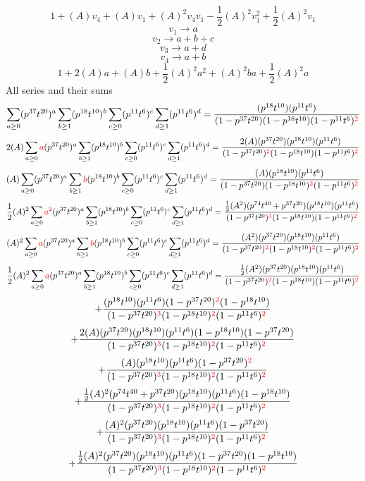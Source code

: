\documentclass{article}
\begin{document}
                \[1+(A)v_4+(A)v_1+(A)^2v_4v_1-\frac{1}{2}(A)^2v_1^{2}+\frac{1}{2}(A)^2v_1\]\[v_1\rightarrow{a}\]\[v_2\rightarrow{a+b+c}\]\[v_3\rightarrow{a+d}\]\[v_4\rightarrow{a+b}\]\[1+2(A)a+(A)b+\frac{1}{2}(A)^2a^{2}+(A)^2ba+\frac{1}{2}(A)^2a\]All series and their sums\[\sum_{a\geq{0}}(p^{37}t^{20})^{a}\sum_{b\geq{1}}(p^{18}t^{10})^{b}\sum_{c\geq{0}}(p^{11}t^{6})^{c}\sum_{d\geq{1}}(p^{11}t^{6})^{d}=\frac{(p^{18}t^{10})(p^{11}t^{6})}{(1-p^{37}t^{20})(1-p^{18}t^{10})(1-p^{11}t^{6})^{\textcolor{red}{2}}}\]\[2(A)\sum_{a\geq{0}}\textcolor{red}{a}(p^{37}t^{20})^{a}\sum_{b\geq{1}}(p^{18}t^{10})^{b}\sum_{c\geq{0}}(p^{11}t^{6})^{c}\sum_{d\geq{1}}(p^{11}t^{6})^{d}=\frac{2(A)(p^{37}t^{20})(p^{18}t^{10})(p^{11}t^{6})}{(1-p^{37}t^{20})^{\textcolor{red}{2}}(1-p^{18}t^{10})(1-p^{11}t^{6})^{\textcolor{red}{2}}}\]\[(A)\sum_{a\geq{0}}(p^{37}t^{20})^{a}\sum_{b\geq{1}}\textcolor{red}{b}(p^{18}t^{10})^{b}\sum_{c\geq{0}}(p^{11}t^{6})^{c}\sum_{d\geq{1}}(p^{11}t^{6})^{d}=\frac{(A)(p^{18}t^{10})(p^{11}t^{6})}{(1-p^{37}t^{20})(1-p^{18}t^{10})^{\textcolor{red}{2}}(1-p^{11}t^{6})^{\textcolor{red}{2}}}\]\[\frac{1}{2}(A)^{2}\sum_{a\geq{0}}\textcolor{red}{a^{2}}(p^{37}t^{20})^{a}\sum_{b\geq{1}}(p^{18}t^{10})^{b}\sum_{c\geq{0}}(p^{11}t^{6})^{c}\sum_{d\geq{1}}(p^{11}t^{6})^{d}=\frac{\frac{1}{2}(A^{2})(p^{74}t^{40}+p^{37}t^{20})(p^{18}t^{10})(p^{11}t^{6})}{(1-p^{37}t^{20})^{\textcolor{red}{3}}(1-p^{18}t^{10})(1-p^{11}t^{6})^{\textcolor{red}{2}}}\]\[(A)^{2}\sum_{a\geq{0}}\textcolor{red}{a}(p^{37}t^{20})^{a}\sum_{b\geq{1}}\textcolor{red}{b}(p^{18}t^{10})^{b}\sum_{c\geq{0}}(p^{11}t^{6})^{c}\sum_{d\geq{1}}(p^{11}t^{6})^{d}=\frac{(A^{2})(p^{37}t^{20})(p^{18}t^{10})(p^{11}t^{6})}{(1-p^{37}t^{20})^{\textcolor{red}{2}}(1-p^{18}t^{10})^{\textcolor{red}{2}}(1-p^{11}t^{6})^{\textcolor{red}{2}}}\]\[\frac{1}{2}(A)^{2}\sum_{a\geq{0}}\textcolor{red}{a}(p^{37}t^{20})^{a}\sum_{b\geq{1}}(p^{18}t^{10})^{b}\sum_{c\geq{0}}(p^{11}t^{6})^{c}\sum_{d\geq{1}}(p^{11}t^{6})^{d}=\frac{\frac{1}{2}(A^{2})(p^{37}t^{20})(p^{18}t^{10})(p^{11}t^{6})}{(1-p^{37}t^{20})^{\textcolor{red}{2}}(1-p^{18}t^{10})(1-p^{11}t^{6})^{\textcolor{red}{2}}}\]\[+\frac{(p^{18}t^{10})(p^{11}t^{6})(1-p^{37}t^{20})^{\textcolor{red}{2}}(1-p^{18}t^{10})}{(1-p^{37}t^{20})^{\textcolor{red}{3}}(1-p^{18}t^{10})^{\textcolor{red}{2}}(1-p^{11}t^{6})^{\textcolor{red}{2}}}\]\[+\frac{2(A)(p^{37}t^{20})(p^{18}t^{10})(p^{11}t^{6})(1-p^{18}t^{10})(1-p^{37}t^{20})}{(1-p^{37}t^{20})^{\textcolor{red}{3}}(1-p^{18}t^{10})^{\textcolor{red}{2}}(1-p^{11}t^{6})^{\textcolor{red}{2}}}\]\[+\frac{(A)(p^{18}t^{10})(p^{11}t^{6})(1-p^{37}t^{20})^{\textcolor{red}{2}}}{(1-p^{37}t^{20})^{\textcolor{red}{3}}(1-p^{18}t^{10})^{\textcolor{red}{2}}(1-p^{11}t^{6})^{\textcolor{red}{2}}}\]\[+\frac{\frac{1}{2}(A)^{2}(p^{74}t^{40}+p^{37}t^{20})(p^{18}t^{10})(p^{11}t^{6})(1-p^{18}t^{10})}{(1-p^{37}t^{20})^{\textcolor{red}{3}}(1-p^{18}t^{10})^{\textcolor{red}{2}}(1-p^{11}t^{6})^{\textcolor{red}{2}}}\]\[+\frac{(A)^{2}(p^{37}t^{20})(p^{18}t^{10})(p^{11}t^{6})(1-p^{37}t^{20})}{(1-p^{37}t^{20})^{\textcolor{red}{3}}(1-p^{18}t^{10})^{\textcolor{red}{2}}(1-p^{11}t^{6})^{\textcolor{red}{2}}}\]\[+\frac{\frac{1}{2}(A)^{2}(p^{37}t^{20})(p^{18}t^{10})(p^{11}t^{6})(1-p^{37}t^{20})(1-p^{18}t^{10})}{(1-p^{37}t^{20})^{\textcolor{red}{3}}(1-p^{18}t^{10})^{\textcolor{red}{2}}(1-p^{11}t^{6})^{\textcolor{red}{2}}}\]
\end{document}

